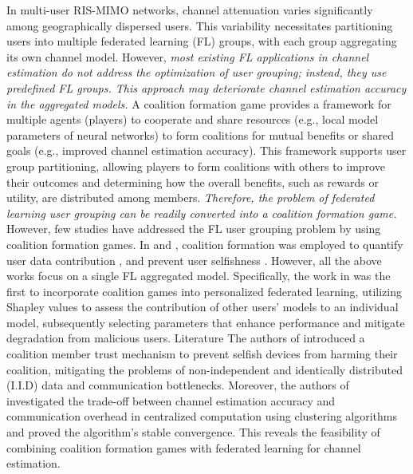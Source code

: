 In multi-user RIS-MIMO networks, channel attenuation varies significantly among geographically dispersed users. This variability necessitates partitioning users into multiple federated learning (FL) groups, with each group aggregating its own channel model. 
However, \emph{most existing FL applications in channel estimation do not address the optimization of user grouping; instead, they use predefined FL groups. This approach  may deteriorate channel estimation accuracy in the aggregated models.}
A coalition formation game provides a framework for multiple agents (players) to cooperate and share resources (e.g., local model parameters of neural networks) to form coalitions for mutual benefits or shared goals (e.g., improved channel estimation accuracy). This framework supports user group partitioning,   allowing players to form coalitions with others to improve their outcomes  and determining  how the overall benefits, such as rewards  or utility, are distributed among members. \emph{Therefore, the problem of federated learning user grouping can be readily converted into a coalition formation game.} However, few studies have addressed the FL user grouping problem by using coalition formation games.
In \cite{Coalition_1} and \cite{Coalition_2}, coalition formation was employed to quantify user data contribution \cite{Coalition_1}, and prevent user selfishness \cite{Coalition_2}. However, all the above works focus on a single FL aggregated model. Specifically,  the work in \cite{Coalition_1} was the first to incorporate coalition games into personalized federated learning, utilizing Shapley values to assess the contribution of other users' models to an individual model, subsequently selecting parameters that enhance performance and mitigate degradation from malicious users. Literature The authors of \cite{Coalition_2} introduced a coalition member trust mechanism to prevent selfish devices from harming their coalition, mitigating the problems of non-independent and identically distributed (I.I.D) data and communication bottlenecks. 
Moreover, the authors of \cite{CF_CE_1} investigated the trade-off between channel estimation accuracy and communication overhead in centralized computation using clustering algorithms and proved the algorithm's stable convergence. This   reveals the feasibility of combining coalition formation games with federated learning for channel estimation.

